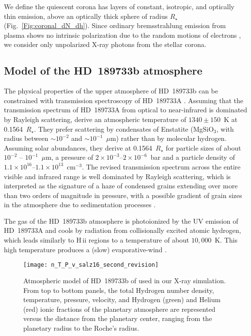 \documentclass[iop]{emulateapj}
\begin{document}
We define the quiescent corona has layers of constant, isotropic, and optically thin emission, above an optically thick sphere of radius 
$R_\star$ (Fig.~\ref{Fig:coronal_dN_dh}). Since ordinary bremsstrahlung emission from plasma shows no intrinsic polarization 
due to the random motions of electrons \citep{Dolan1967}, we consider only unpolarized X-ray photons from the stellar corona. 

\subsection{Model of the HD~189733b atmosphere}
\label{Model:Atmosphere}

The physical properties of the upper atmosphere of HD~189733b can be constrained with transmission spectroscopy of HD~189733A 
\citep[for a review of exoplanetary atmospheres see][]{Madhusudhan2014}. Assuming that the transmission spectrum of HD~189733A from optical 
to near-infrared is dominated by Rayleigh scattering, \cite{Lecavelier2008} derive an atmospheric temperature of $1340\pm150$~K 
at 0.1564~$R_\star$. They prefer scattering by condensates of Enstatite (MgSiO$_3$, with radius between $\sim10^{-2}$ 
and $\sim10^{-1}$~$\mu$m) rather than by molecular hydrogen. Assuming solar abundances, they derive at 0.1564~$R_\star$ for particle 
sizes of about $10^{-2}$ -- $10^{-1}$~$\mu$m, a pressure of $2\times10^{-3}$--$2\times10^{-6}$~bar and a particle density of
$1.1\times10^{16}$--$1.1\times10^{13}$~cm$^{-3}$. The revised transmission spectrum across the entire visible and infrared range 
is well dominated by Rayleigh scattering, which is interpreted as the signature of a haze of condensed grains extending over more 
than two orders of magnitude in pressure, with a possible gradient of grain sizes in the atmosphere due to sedimentation processes 
\citep{Pont2013}.

The gas of the HD~189733b atmosphere is photoionized by the UV emission of HD~189733A \citep[e.g.,][]{Sanz2011} and cools by 
radiation from collisionally excited atomic hydrogen, which leads similarly to H\,{\sc ii} regions to a temperature of about 
$10,000$~K. This high temperature produces  a (slow) evaporative-wind \citep{Yelle2004,Murray2009}. 

\begin{figure}[!t]
  \centering
  \texttt{[image: n\_T\_P\_v\_salz16\_second\_revision]} 
  \caption{Atmospheric model of HD~189733b of \citet{Salz2016}
	   used in our X-ray simulation. From top to bottom panels, 
	   the total Hydrogen number density, temperature, pressure, 
	   velocity, and Hydrogen (green) and Helium (red) ionic fractions
	   of the planetary atmosphere are represented versus 
           the distance from the planetary center,  
           ranging from the planetary radius to the Roche's radius.}
  \label{Fig:Model} 
\end{figure}
\end{document}
